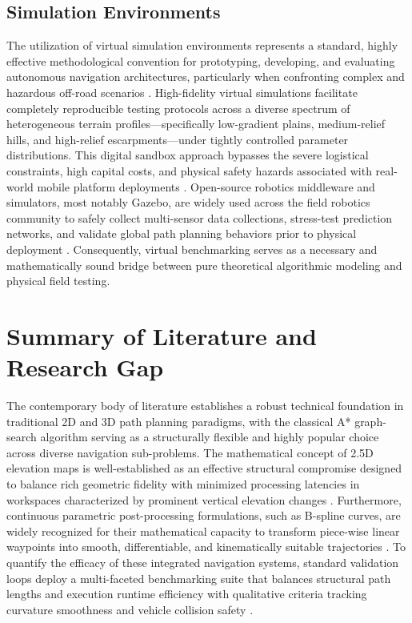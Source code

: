\subsection{Simulation Environments}

The utilization of virtual simulation environments represents a standard, highly effective
methodological convention for prototyping, developing, and evaluating autonomous navigation
architectures, particularly when confronting complex and hazardous off-road scenarios \citep{Liu_2023_autonomousnavigation,
Broggi_2008_autonomousoffroad, Chilian_2011_multisensordata}. High-fidelity virtual simulations facilitate completely reproducible testing
protocols across a diverse spectrum of heterogeneous terrain profiles---specifically low-gradient
plains, medium-relief hills, and high-relief escarpments---under tightly controlled parameter
distributions. This digital sandbox approach bypasses the severe logistical constraints, high
capital costs, and physical safety hazards associated with real-world mobile platform deployments
\citep{Stentz_2003_integratedairground}. Open-source robotics middleware and simulators, most notably Gazebo, are widely used
across the field robotics community to safely collect multi-sensor data collections, stress-test
prediction networks, and validate global path planning behaviors prior to physical deployment
\citep{Liu_2023_autonomousnavigation}. Consequently, virtual benchmarking serves as a necessary and mathematically sound
bridge between pure theoretical algorithmic modeling and physical field testing.

\section{Summary of Literature and Research Gap}

The contemporary body of literature establishes a robust technical foundation in traditional 2D and
3D path planning paradigms, with the classical A* graph-search algorithm serving as a structurally
flexible and highly popular choice across diverse navigation sub-problems. The mathematical concept
of 2.5D elevation maps is well-established as an effective structural compromise designed to balance
rich geometric fidelity with minimized processing latencies in workspaces characterized by prominent
vertical elevation changes \citep{Xie_2020_25dnavigation, Bettencourt_2025_indoor25d}. Furthermore, continuous parametric post-processing
formulations, such as B-spline curves, are widely recognized for their mathematical capacity to
transform piece-wise linear waypoints into smooth, differentiable, and kinematically suitable
trajectories \citep{Zhang_2021_mobilerobot}. To quantify the efficacy of these integrated navigation systems,
standard validation loops deploy a multi-faceted benchmarking suite that balances structural path
lengths and execution runtime efficiency with qualitative criteria tracking curvature smoothness and
vehicle collision safety \citep{Karur_2021_surveypath, Karur_2021_surveypath, Mac_2016_heuristicapproach}.

